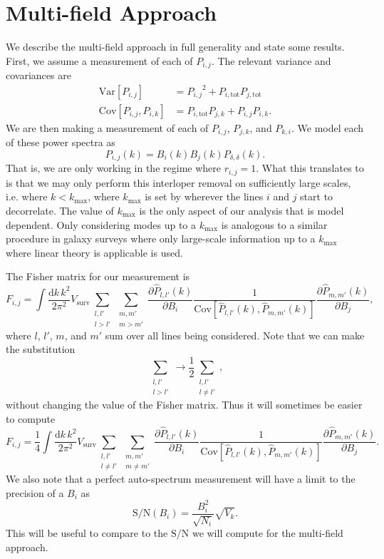 \documentclass{aastex62}
\newcommand{\beq}{\begin{equation}}
\newcommand{\eeq}{\end{equation}}
\newcommand{\denps}{\ensuremath{P_{\delta,\delta}}}
\newcommand{\xps}[2]{\ensuremath{P_{#1,#2}}}
\newcommand{\pstot}[1]{\ensuremath{P_{#1,\text{tot}}}}
\newcommand{\Var}[1]{\mathrm{Var}[#1]}
\newcommand{\Cov}[2]{\mathrm{Cov}[#1,#2]}
\begin{document}
\section{Multi-field Approach}\label{sec:theory}
We describe the multi-field approach in full generality and state some
results. First, we assume a measurement of each of $\xps{i}{j}$. The relevant
variance and covariances are \citep[e.g.][]{2015JCAP...03..034V}
\beq\label{eq:var_cov}
\begin{split}
\Var{\xps{i}{j}} &= \xps{i}{j}^2 + \pstot{i}\pstot{j} \\
\Cov{\xps{i}{j}}{\xps{i}{k}} &= \pstot{i}\xps{j}{k} +
\xps{i}{j}\xps{i}{k}\text{.}
\end{split}
\eeq
We are then making a measurement of each of $\xps{i}{j}$, $\xps{j}{k}$,
and $\xps{k}{i}$. We model each of these power spectra as
\beq
\xps{i}{j}(k) = B_i(k) B_j(k) \denps(k)\text{.}
\eeq
That is, we are only working in the regime where $r_{i,j}=1$. What this
translates to is that we may only perform this interloper removal on
sufficiently large scales, i.e. where $k<k_{\text{max}}$, where
$k_{\text{max}}$ is set by wherever the lines $i$ and $j$ start to
decorrelate. The value of $k_{\text{max}}$ is the only aspect of our analysis
that is model dependent. Only considering modes up to a $k_{\text{max}}$ is
analogous to a similar procedure in galaxy surveys where only large-scale
information up to a $k_{\text{max}}$ where linear theory is applicable is used.

The Fisher matrix for our measurement is
\beq\label{eq:fisher}
F_{i,j} = 
\int \frac{\text{d}k\,k^2}{2\pi^2} V_{\text{surv}} 
\sum_{\substack{l,l'\\l > l'}} \sum_{\substack{m,m'\\m > m'}}
\frac{\partial \hat{P}_{l,l'}(k)}{\partial B_i}
\frac{1}{\Cov{\hat{P}_{l,l'}(k)}{\hat{P}_{m,m'}(k)}} 
\frac{\partial \hat{P}_{m,m'}(k)}{\partial B_j}\text{,}
\eeq
where $l$, $l'$, $m$, and $m'$ sum over all lines being considered. Note that
we can make the substitution
\begin{equation*}
\sum_{\substack{l,l'\\l > l'}} \rightarrow 
\frac{1}{2} \sum_{\substack{l,l'\\l \neq l'}}\text{,}
\end{equation*}
without changing the value of the Fisher matrix. Thus it will sometimes be
easier to compute
\beq\label{eq:fisher4}
F_{i,j} = 
\frac{1}{4} \int \frac{\text{d}k\,k^2}{2\pi^2} V_{\text{surv}} 
\sum_{\substack{l,l'\\l \neq l'}} \sum_{\substack{m,m'\\m \neq m'}}
\frac{\partial \hat{P}_{l,l'}(k)}{\partial B_i}
\frac{1}{\Cov{\hat{P}_{l,l'}(k)}{\hat{P}_{m,m'}(k)}} 
\frac{\partial \hat{P}_{m,m'}(k)}{\partial B_j}\text{.}
\eeq
We also note that a perfect auto-spectrum measurement will have a limit to the
precision of a $B_i$ as
\beq\label{eq:Bi_auto_snr}
\text{S}/\text{N}(B_i) = \frac{B_i^2}{\sqrt{N_i}}\sqrt{V_k}\text{.}
\eeq
This will be useful to compare to the $\text{S}/\text{N}$ we will compute for
the multi-field approach.
\end{document}

